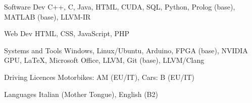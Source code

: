 
\begin{cvskills}

\cvskill
{Software Dev} %
{C++, C, Java, HTML, CUDA, SQL, Python, Prolog (base), MATLAB (base), LLVM-IR} %

\cvskill
{Web Dev} %
{HTML, CSS, JavaScript, PHP} %

\cvskill
{Systems and Tools} %
{Windows, Linux/Ubuntu, Arduino, FPGA (base), NVIDIA GPU, LaTeX, Microsoft Office, LLVM, Git (base), LLVM/Clang} %

\cvskill
{Driving Licences} %
{Motorbikes: AM (EU/IT), Cars: B (EU/IT)} %

\cvskill
{Languages} %
{Italian (Mother Tongue), English (B2)} %

\end{cvskills}
